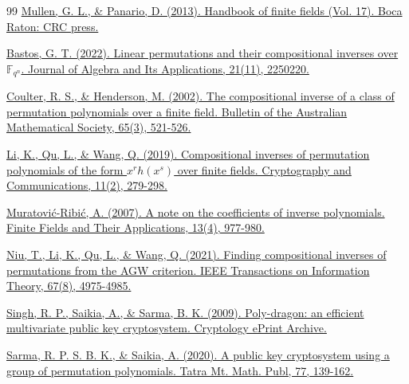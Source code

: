 \documentclass{birkjour}
\theoremstyle{definition}
\theoremstyle{remark}
\numberwithin{equation}{section}
\begin{document}
\begin{thebibliography}{99}
	\href{https://jackgiffin.com/main/pdfs/Handbook-of-Finite-Fields-Gary-L-Mullen.pdf}{Mullen, G. L., \& Panario, D. (2013). Handbook of finite fields (Vol. 17). Boca Raton: CRC press.}
	
	\href{https://doi.org/10.1142/S0219498822502206}{Bastos, G. T. (2022). Linear permutations and their compositional inverses over $\mathbb{F}_{q^n}$. Journal of Algebra and Its Applications, 21(11), 2250220.}
		
	\href{https://doi.org/10.1017/S0004972700020578}{Coulter, R. S., \& Henderson, M. (2002). The compositional inverse of a class of permutation polynomials over a finite field. Bulletin of the Australian Mathematical Society, 65(3), 521-526.}
		
		
	\href{https://link.springer.com/article/10.1007/s12095-018-0292-7}{Li, K., Qu, L., \& Wang, Q. (2019). Compositional inverses of permutation polynomials of the form $x^rh(x^s)$ over finite fields. Cryptography and Communications, 11(2), 279-298.}
		
	\href{https://doi.org/10.1016/j.ffa.2006.11.003}{Muratović-Ribić, A. (2007). A note on the coefficients of inverse polynomials. Finite Fields and Their Applications, 13(4), 977-980.}
	
	\href{https://ieeexplore.ieee.org/abstract/document/9454436}{Niu, T., Li, K., Qu, L., \& Wang, Q. (2021). Finding compositional inverses of permutations from the AGW criterion. IEEE Transactions on Information Theory, 67(8), 4975-4985.}

\href{https://ia.cr/2009/587}{Singh, R. P., Saikia, A., \& Sarma, B. K. (2009). Poly-dragon: an efficient multivariate public key cryptosystem. Cryptology ePrint Archive.}



\href{https://sciendo.com/2/v2/download/article/10.2478/tmmp-2020-0013.pdf}{Sarma, R. P. S. B. K., \& Saikia, A. (2020). A public key cryptosystem using a group of permutation polynomials. Tatra Mt. Math. Publ, 77, 139-162.}





\end{thebibliography}
\end{document}

